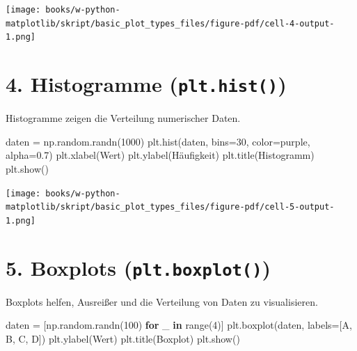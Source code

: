 \documentclass[
  letterpaper,
  DIV=11,
  numbers=noendperiod]{scrreprt}
\newenvironment{Shaded}{\begin{snugshade}}{\end{snugshade}}
\newcommand{\BuiltInTok}[1]{\textcolor[rgb]{0.00,0.23,0.31}{#1}}
\newcommand{\ControlFlowTok}[1]{\textcolor[rgb]{0.00,0.23,0.31}{\textbf{#1}}}
\newcommand{\DecValTok}[1]{\textcolor[rgb]{0.68,0.00,0.00}{#1}}
\newcommand{\FloatTok}[1]{\textcolor[rgb]{0.68,0.00,0.00}{#1}}
\newcommand{\KeywordTok}[1]{\textcolor[rgb]{0.00,0.23,0.31}{\textbf{#1}}}
\newcommand{\NormalTok}[1]{\textcolor[rgb]{0.00,0.23,0.31}{#1}}
\newcommand{\OperatorTok}[1]{\textcolor[rgb]{0.37,0.37,0.37}{#1}}
\newcommand{\StringTok}[1]{\textcolor[rgb]{0.13,0.47,0.30}{#1}}
\begin{document}
\texttt{[image: books/w-python-matplotlib/skript/basic\_plot\_types\_files/figure-pdf/cell-4-output-1.png]}

\section{\texorpdfstring{4. Histogramme
(\texttt{plt.hist()})}{4. Histogramme (plt.hist())}}\label{histogramme-plt.hist}

Histogramme zeigen die Verteilung numerischer Daten.

\begin{Shaded}
\begin{Highlighting}[]
\NormalTok{daten }\OperatorTok{=}\NormalTok{ np.random.randn(}\DecValTok{1000}\NormalTok{)}
\NormalTok{plt.hist(daten, bins}\OperatorTok{=}\DecValTok{30}\NormalTok{, color}\OperatorTok{=}\StringTok{\textquotesingle{}purple\textquotesingle{}}\NormalTok{, alpha}\OperatorTok{=}\FloatTok{0.7}\NormalTok{)}
\NormalTok{plt.xlabel(}\StringTok{\textquotesingle{}Wert\textquotesingle{}}\NormalTok{)}
\NormalTok{plt.ylabel(}\StringTok{\textquotesingle{}Häufigkeit\textquotesingle{}}\NormalTok{)}
\NormalTok{plt.title(}\StringTok{\textquotesingle{}Histogramm\textquotesingle{}}\NormalTok{)}
\NormalTok{plt.show()}
\end{Highlighting}
\end{Shaded}

\texttt{[image: books/w-python-matplotlib/skript/basic\_plot\_types\_files/figure-pdf/cell-5-output-1.png]}

\section{\texorpdfstring{5. Boxplots
(\texttt{plt.boxplot()})}{5. Boxplots (plt.boxplot())}}\label{boxplots-plt.boxplot}

Boxplots helfen, Ausreißer und die Verteilung von Daten zu
visualisieren.

\begin{Shaded}
\begin{Highlighting}[]
\NormalTok{daten }\OperatorTok{=}\NormalTok{ [np.random.randn(}\DecValTok{100}\NormalTok{) }\ControlFlowTok{for}\NormalTok{ \_ }\KeywordTok{in} \BuiltInTok{range}\NormalTok{(}\DecValTok{4}\NormalTok{)]}
\NormalTok{plt.boxplot(daten, labels}\OperatorTok{=}\NormalTok{[}\StringTok{\textquotesingle{}A\textquotesingle{}}\NormalTok{, }\StringTok{\textquotesingle{}B\textquotesingle{}}\NormalTok{, }\StringTok{\textquotesingle{}C\textquotesingle{}}\NormalTok{, }\StringTok{\textquotesingle{}D\textquotesingle{}}\NormalTok{])}
\NormalTok{plt.ylabel(}\StringTok{\textquotesingle{}Wert\textquotesingle{}}\NormalTok{)}
\NormalTok{plt.title(}\StringTok{\textquotesingle{}Boxplot\textquotesingle{}}\NormalTok{)}
\NormalTok{plt.show()}
\end{Highlighting}
\end{Shaded}
\end{document}
